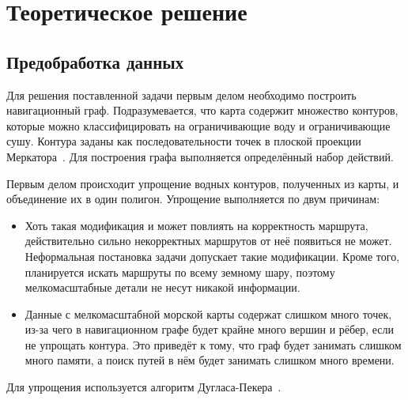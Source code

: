 \chapter{Теоретическое решение}

\section{Предобработка данных}

Для решения поставленной задачи первым делом необходимо построить
навигационный граф. Подразумевается, что карта содержит множество
контуров, которые можно классифицировать на ограничивающие воду и
ограничивающие сушу. Контура заданы как последовательности точек в
плоской проекции Меркатора~\cite{thomas1952conformal}. Для построения
графа выполняется определённый набор действий.

Первым делом происходит упрощение водных контуров, полученных из карты, и
объединение их в один полигон. Упрощение выполняется по двум причинам:
\begin{itemize}
    \item Хоть такая модификация и может повлиять на корректность
      маршрута, действительно сильно некорректных маршрутов от неё
      появиться не может. Неформальная постановка задачи допускает
      такие модификации. Кроме того, планируется искать маршруты по
      всему земному шару, поэтому мелкомасштабные детали не несут
      никакой информации.
    \item Данные с мелкомасштабной морской карты содержат слишком
      много точек, из-за чего в навигационном графе будет крайне много
      вершин и рёбер, если не упрощать контура. Это приведёт к тому,
      что граф будет занимать слишком много памяти, а поиск путей в
      нём будет занимать слишком много времени.
\end{itemize}
Для упрощения используется алгоритм Дугласа-Пекера~\cite{douglas1973algorithms}.

